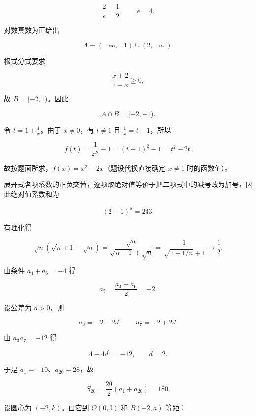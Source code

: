 \begin{answer}
\nopagebreak[4]
\[
\frac2e=\frac12,\qquad e=4.
\]


对数真数为正给出

\nopagebreak[4]
\[
A=(-\infty,-1)\cup(2,+\infty).
\]

根式分式要求

\nopagebreak[4]
\[
\frac{x+2}{1-x}\ge0,
\]

故 $B=[-2,1)$。因此

\nopagebreak[4]
\[
A\cap B=[-2,-1).
\]


令 $t=1+\frac1x$。由于 $x\ne0$，有 $t\ne1$ 且 $\frac1x=t-1$，所以

\nopagebreak[4]
\[
f(t)=\frac1{x^2}-1=(t-1)^2-1=t^2-2t.
\]

故按题面所求，$f(x)=x^2-2x$（题设代换直接确定 $x\ne1$ 时的函数值）。



展开式各项系数的正负交替，逐项取绝对值等价于把二项式中的减号改为加号，因此绝对值系数和为

\nopagebreak[4]
\[
(2+1)^5=243.
\]


有理化得

\nopagebreak[4]
\[
\sqrt n(\sqrt{n+1}-\sqrt n)
=\frac{\sqrt n}{\sqrt{n+1}+\sqrt n}
=\frac1{\sqrt{1+1/n}+1}
\longrightarrow\frac12.
\]


由条件 $a_4+a_6=-4$ 得

\nopagebreak[4]
\[
a_5=\frac{a_4+a_6}{2}=-2.
\]

设公差为 $d>0$，则

\nopagebreak[4]
\[
a_3=-2-2d,\qquad a_7=-2+2d.
\]

由 $a_3a_7=-12$ 得

\nopagebreak[4]
\[
4-4d^2=-12,
\qquad d=2.
\]

于是 $a_1=-10$、$a_{20}=28$，故

\nopagebreak[4]
\[
S_{20}=\frac{20}{2}(a_1+a_{20})=180.
\]


设圆心为 $(-2,k)$。由它到 $O(0,0)$ 和 $B(-2,a)$ 等距：


\end{answer}
